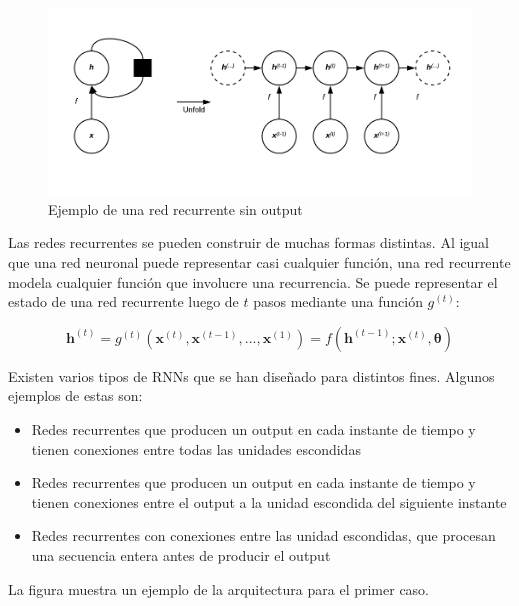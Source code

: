 \begin{figure}[H]
\captionsetup{font=small,labelfont=small}
\caption{Ejemplo de una red recurrente sin output}
\centering
\includegraphics[scale=.5]{img/RNN1.png}
\end{figure}

Las redes recurrentes se pueden construir de muchas formas distintas. Al igual que una red neuronal puede representar casi cualquier funci\'on, una red recurrente modela cualquier funci\'on que involucre una recurrencia. Se puede representar el estado de una red recurrente luego de $t$ pasos mediante una funci\'on $g^{(t)}$:

\begin{equation}
\bm{h}^{(t)} = g^{(t)}(\bm{x}^{(t)},\bm{x}^{(t-1)},...,\bm{x}^{(1)}) =  f(\bm{h}^{(t-1)}; \bm{x}^{(t)}, \bm{\theta})
\end{equation}

Existen varios tipos de RNNs que se han dise{\~{n}}ado para distintos fines. Algunos ejemplos de estas son:

\begin{itemize}
  \item Redes recurrentes que producen un output en cada instante de tiempo y tienen conexiones entre todas las unidades escondidas
  \item Redes recurrentes que producen un output en cada instante de tiempo y tienen conexiones entre el output a la unidad escondida del siguiente instante
  \item Redes recurrentes con conexiones entre las unidad escondidas, que procesan una secuencia entera antes de producir el output
\end{itemize}

La figura muestra un ejemplo de la arquitectura para el primer caso.

